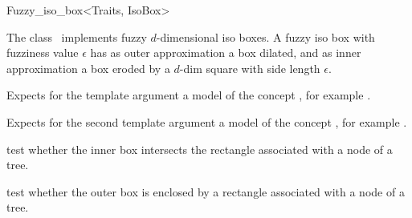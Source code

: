 

\begin{ccRefClass}{Fuzzy_iso_box<Traits, IsoBox>}  %


\ccDefinition
  
The class \ccRefName\ implements fuzzy $d$-dimensional iso boxes.  A
fuzzy iso box with fuzziness value $\epsilon$ has as outer
approximation a box dilated, and as inner approximation a box eroded
by a $d$-dim square with side length $\epsilon$.


\ccParameters
Expects for the template argument a model of the concept
, for example .

Expects for the second template argument  a model 
of the concept , for example .
 
\ccIsModel


\ccTypes


\ccCreation
{}  %


\ccOperations


{test whether the inner box intersects the rectangle
associated with a node of a tree.}

{test whether the outer box is enclosed by a rectangle
associated with a node of a tree.}

\ccSeeAlso


\end{ccRefClass}


